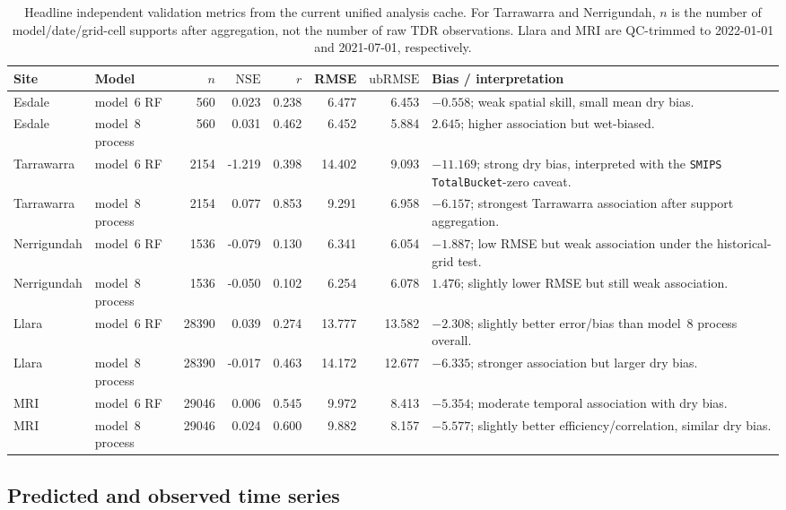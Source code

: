 \documentclass[11pt,a4paper]{article}
\newcommand{\nse}{\ensuremath{\mathrm{NSE}}}
\newcommand{\ubrmse}{\ensuremath{\mathrm{ubRMSE}}}
\newcommand{\pearsonr}{\ensuremath{r}}
\newcommand{\modelSix}{model~6 RF}
\newcommand{\modelEight}{model~8 process}
\newcommand{\smips}{\texttt{SMIPS TotalBucket}}
\begin{document}
\begin{table}[htbp]
\centering
\small
\caption{Headline independent validation metrics from the current unified
analysis cache.  For Tarrawarra and Nerrigundah, $n$ is the number of
model/date/grid-cell supports after aggregation, not the number of raw TDR
observations.  Llara and MRI are QC-trimmed to 2022-01-01 and 2021-07-01,
respectively.}
\label{tab:headline-metrics}
\begin{tabularx}{\textwidth}{llrrrrrX}
\toprule
Site & Model & $n$ & \nse{} & $\pearsonr$ & RMSE & \ubrmse{} & Bias / interpretation \\
\midrule
Esdale & \modelSix{} & 560 & 0.023 & 0.238 & 6.477 & 6.453
  & $-0.558$; weak spatial skill, small mean dry bias. \\
Esdale & \modelEight{} & 560 & 0.031 & 0.462 & 6.452 & 5.884
  & $2.645$; higher association but wet-biased. \\
Tarrawarra & \modelSix{} & 2154 & -1.219 & 0.398 & 14.402 & 9.093
  & $-11.169$; strong dry bias, interpreted with the \smips{}-zero caveat. \\
Tarrawarra & \modelEight{} & 2154 & 0.077 & 0.853 & 9.291 & 6.958
  & $-6.157$; strongest Tarrawarra association after support aggregation. \\
Nerrigundah & \modelSix{} & 1536 & -0.079 & 0.130 & 6.341 & 6.054
  & $-1.887$; low RMSE but weak association under the historical-grid test. \\
Nerrigundah & \modelEight{} & 1536 & -0.050 & 0.102 & 6.254 & 6.078
  & $1.476$; slightly lower RMSE but still weak association. \\
Llara & \modelSix{} & 28390 & 0.039 & 0.274 & 13.777 & 13.582
  & $-2.308$; slightly better error/bias than \modelEight{} overall. \\
Llara & \modelEight{} & 28390 & -0.017 & 0.463 & 14.172 & 12.677
  & $-6.335$; stronger association but larger dry bias. \\
MRI & \modelSix{} & 29046 & 0.006 & 0.545 & 9.972 & 8.413
  & $-5.354$; moderate temporal association with dry bias. \\
MRI & \modelEight{} & 29046 & 0.024 & 0.600 & 9.882 & 8.157
  & $-5.577$; slightly better efficiency/correlation, similar dry bias. \\
\bottomrule
\end{tabularx}
\end{table}

\subsection{Predicted and observed time series}\label{sec:stage1-timeseries}
\end{document}
